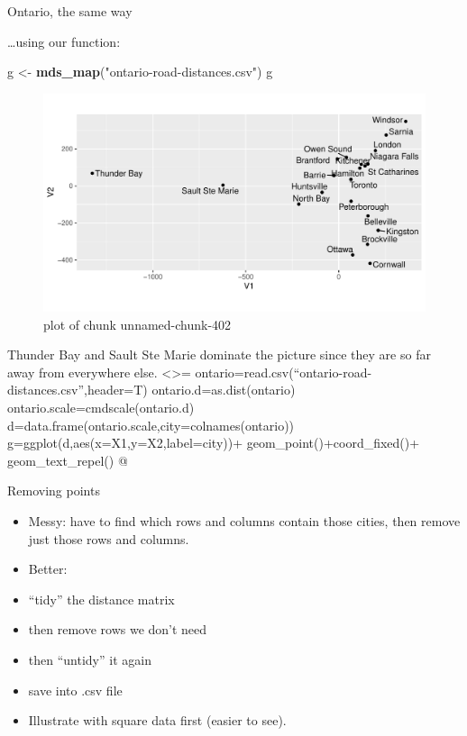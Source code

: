 \documentclass[ignorenonframetext,]{beamer}
\newenvironment{Shaded}{\begin{snugshade}}{\end{snugshade}}
\newcommand{\KeywordTok}[1]{\textcolor[rgb]{0.13,0.29,0.53}{\textbf{#1}}}
\newcommand{\NormalTok}[1]{#1}
\newcommand{\StringTok}[1]{\textcolor[rgb]{0.31,0.60,0.02}{#1}}
\begin{document}
\begin{frame}[fragile]{Ontario, the same way}
\protect\hypertarget{ontario-the-same-way}{}

\ldots using our function:

\begin{Shaded}
\begin{Highlighting}[]
\NormalTok{g <-}\StringTok{ }\KeywordTok{mds_map}\NormalTok{(}\StringTok{"ontario-road-distances.csv"}\NormalTok{)}
\NormalTok{g}
\end{Highlighting}
\end{Shaded}

\begin{figure}
\centering
\includegraphics{figure/unnamed-chunk-402-1.pdf}
\caption{plot of chunk unnamed-chunk-402}
\end{figure}

Thunder Bay and Sault Ste Marie dominate the picture since they are so
far away from everywhere else. \textless{}\textgreater{}=
ontario=read.csv(``ontario-road-distances.csv'',header=T)
ontario.d=as.dist(ontario) ontario.scale=cmdscale(ontario.d)
d=data.frame(ontario.scale,city=colnames(ontario))
g=ggplot(d,aes(x=X1,y=X2,label=city))+ geom\_point()+coord\_fixed()+
geom\_text\_repel() @

\end{frame}

\begin{frame}{Removing points}
\protect\hypertarget{removing-points}{}

\begin{itemize}
\item
  Messy: have to find which rows and columns contain those cities, then
  remove just those rows and columns.
\item
  Better:
\item
  ``tidy'' the distance matrix
\item
  then remove rows we don't need
\item
  then ``untidy'' it again
\item
  save into .csv file
\item
  Illustrate with square data first (easier to see).
\end{itemize}

\end{frame}
\end{document}
